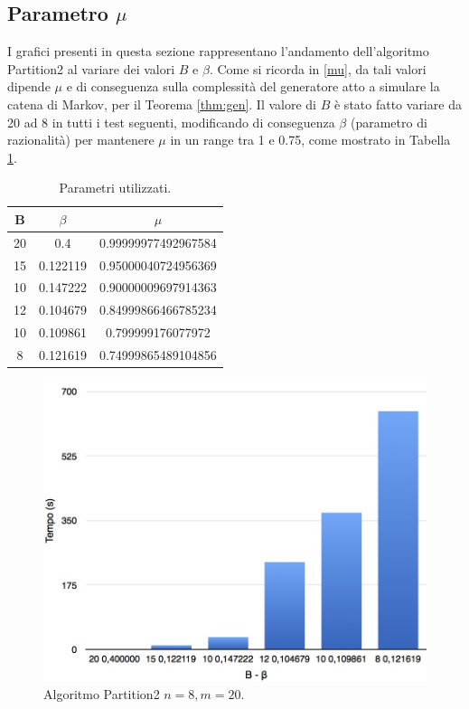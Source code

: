 \subsection{Parametro $\mu$}
I grafici presenti in questa sezione rappresentano l'andamento dell'algoritmo Partition2 al variare dei valori $B$ e $\beta$. Come si ricorda in \ref{mu}, da tali valori dipende $\mu$ e di conseguenza sulla complessità del generatore atto a simulare la catena di Markov, per il Teorema \ref{thm:gen}. Il valore di $B$ è stato fatto variare da 20 ad 8 in tutti i test seguenti, modificando di conseguenza $\beta$ (parametro di razionalità) per mantenere $\mu$ in un range tra 1 e 0.75, come mostrato in Tabella \ref{tab:bbetamu}.
\begin{table}[]
	\centering
	\begin{tabular}{|c|c|c|}
		\hline
		B  & $\beta$  & $\mu$               \\ \hline
		20 & 0.4      & 0.99999977492967584 \\ \hline
		15 & 0.122119 & 0.95000040724956369 \\ \hline
		10 & 0.147222 & 0.90000009697914363 \\ \hline
		12 & 0.104679 & 0.84999866466785234 \\ \hline
		10 & 0.109861 & 0.799999176077972   \\ \hline
		8  & 0.121619 & 0.74999865489104856 \\ \hline
	\end{tabular}
	\caption{Parametri utilizzati.}
	\label{tab:bbetamu}
\end{table}
\begin{figure}[h!]
	\vspace*{1cm}
	\centering
	\includegraphics[scale=.3]{img/Bbeta/8_20.jpg}
	\caption{Algoritmo Partition2 $n = 8, m = 20$.}
\end{figure}
